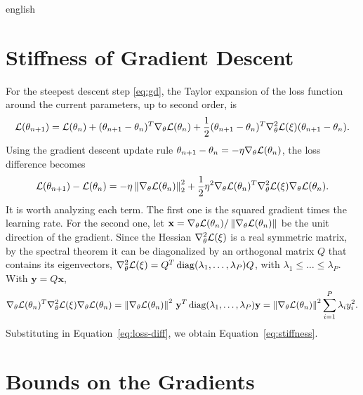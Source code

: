 \documentclass[../0000.tex]{subfiles}
\begin{document}
\begin{hyphenrules}{english}
\section{Stiffness of Gradient Descent}\label{app-sec:stiffness}

For the steepest descent step \eqref{eq:gd}, the Taylor expansion of the loss function around the
current parameters, up to second order, is
\begin{equation}
  \mathcal{L}(\theta_{n+1})=\mathcal{L}(\theta_n)+(\theta_{n+1}-\theta_n)^{T}\nabla_\theta\mathcal{L}(\theta_n)
  +\frac12(\theta_{n+1}-\theta_n)^{T}\nabla^2_\theta\mathcal{L}(\xi)(\theta_{n+1}-\theta_n).
  \label{eq:taylor}
\end{equation}
Using the gradient descent update rule $\theta_{n+1}-\theta_n=-\eta\nabla_\theta\mathcal{L}(\theta_n)$, the
loss difference becomes
\begin{equation}
  \mathcal{L}(\theta_{n+1})-\mathcal{L}(\theta_n)=-\eta\left\lVert \nabla_\theta\mathcal{L}(\theta_n) \right\rVert_2^2
  +\frac12\eta^2\nabla_\theta\mathcal{L}(\theta_n)^{T}\nabla^2_\theta\mathcal{L}(\xi)\nabla_\theta\mathcal{L}(\theta_n).
  \label{eq:loss-diff}
\end{equation}
It is worth analyzing each term. The first one is the squared gradient times the learning rate. For the
second one, let $\mathbf{x}=\nabla_\theta\mathcal{L}(\theta_n)/\left\lVert \nabla_\theta\mathcal{L}(\theta_n) \right\rVert$ be the unit
direction of the gradient. Since the Hessian $\nabla^2_\theta\mathcal{L}(\xi)$ is a real symmetric matrix, by the
spectral theorem \cite{trefethen1997} it can be diagonalized by an orthogonal matrix $Q$ that contains
its eigenvectors, $\nabla^2_\theta\mathcal{L}(\xi)=Q^{T}\operatorname{diag}(\lambda_1,\dots,\lambda_P)Q$, with
$\lambda_1\le\dots\le\lambda_P$. With $\mathbf{y}=Q\mathbf{x}$,
\begin{equation}
  \nabla_\theta\mathcal{L}(\theta_n)^{T}\nabla^2_\theta\mathcal{L}(\xi)\nabla_\theta\mathcal{L}(\theta_n)
  =\left\lVert \nabla_\theta\mathcal{L}(\theta_n) \right\rVert^2\,\mathbf{y}^{T}\operatorname{diag}(\lambda_1,\dots,\lambda_P)\mathbf{y}
  =\left\lVert \nabla_\theta\mathcal{L}(\theta_n) \right\rVert^2\sum_{i=1}^{P}\lambda_iy_i^2.
  \label{eq:hessian-quadratic}
\end{equation}
Substituting in Equation~\eqref{eq:loss-diff}, we obtain Equation~\eqref{eq:stiffness}.

\section{Bounds on the Gradients}\label{app-sec:grad-bounds}


\end{hyphenrules}
\end{document}
